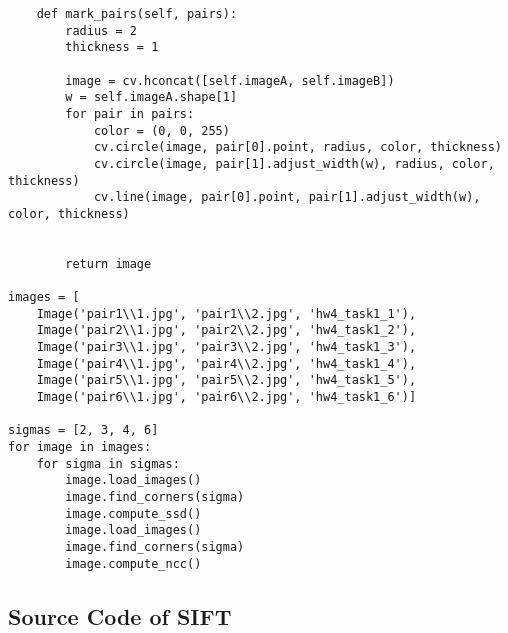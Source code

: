 \documentclass[11pt]{article}
\begin{document}
\begin{lstlisting}
    def mark_pairs(self, pairs):
        radius = 2
        thickness = 1
        
        image = cv.hconcat([self.imageA, self.imageB])
        w = self.imageA.shape[1]
        for pair in pairs:
            color = (0, 0, 255)
            cv.circle(image, pair[0].point, radius, color, thickness)
            cv.circle(image, pair[1].adjust_width(w), radius, color, thickness)
            cv.line(image, pair[0].point, pair[1].adjust_width(w), color, thickness)

        
        return image

images = [
    Image('pair1\\1.jpg', 'pair1\\2.jpg', 'hw4_task1_1'),
    Image('pair2\\1.jpg', 'pair2\\2.jpg', 'hw4_task1_2'),
    Image('pair3\\1.jpg', 'pair3\\2.jpg', 'hw4_task1_3'),
    Image('pair4\\1.jpg', 'pair4\\2.jpg', 'hw4_task1_4'),
    Image('pair5\\1.jpg', 'pair5\\2.jpg', 'hw4_task1_5'),
    Image('pair6\\1.jpg', 'pair6\\2.jpg', 'hw4_task1_6')]

sigmas = [2, 3, 4, 6]
for image in images:
    for sigma in sigmas:
        image.load_images()
        image.find_corners(sigma)
        image.compute_ssd()
        image.load_images()
        image.find_corners(sigma)
        image.compute_ncc()
\end{lstlisting}


\subsection*{Source Code of SIFT}
\end{document}
